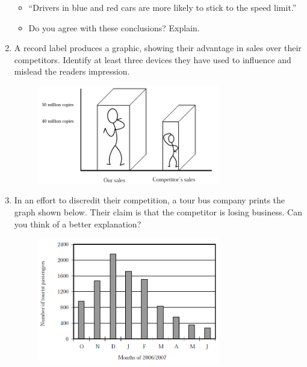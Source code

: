 \begin{description}[noitemsep]
\begin{description}[noitemsep]
\begin{enumerate}[noitemsep, label=\textbf{\arabic*}. ]
\begin{itemize}[noitemsep]
\label{m39404*uid117}\item ``Drivers in blue and red cars are more likely to stick to the speed limit.''
\label{m39404*uid118}\item Do you agree with these conclusions? Explain.
\end{itemize}
                \label{m39404*uid119}\item A record label produces a graphic, showing their advantage in sales over their competitors. Identify at least three devices they have used to influence and mislead the readers impression.
    \setcounter{subfigure}{0}
	\begin{figure}[H] %
    \begin{center}
    \label{m39404*id216327!!!underscore!!!media}\label{m39404*id216327!!!underscore!!!printimage}\includegraphics[width=300px]{col11306.imgs/m39404_MG10C16_013.png} %
      \vspace{2pt}
    \vspace{.1in}
    \end{center}
 \end{figure}               \label{m39404*uid120}\item In an effort to discredit their competition, a tour bus company prints the graph shown below. Their claim is that the competitor is losing business. Can you think of a better explanation?
    \setcounter{subfigure}{0}
	\begin{figure}[H] %
    \begin{center}
    \label{m39404*id216351!!!underscore!!!media}\label{m39404*id216351!!!underscore!!!printimage}\includegraphics[width=300px]{col11306.imgs/m39404_MG10C16_014.png} %

\end{center}
\end{figure}
\end{enumerate}
\end{description}
\end{description}
